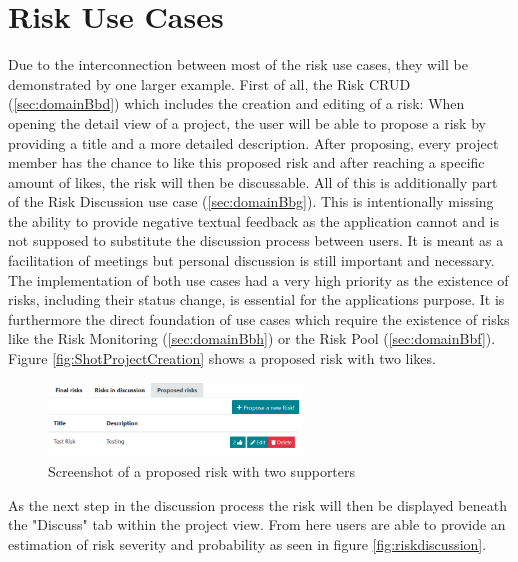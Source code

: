 
\section{Risk Use Cases}
\label{sec:implementationRisks}

Due to the interconnection between most of the risk use cases, they will be demonstrated by one larger example. First of all, the Risk CRUD (\ref{sec:domainBbd}) which includes the creation and editing of a risk: When opening the detail view of a project, the user will be able to propose a risk by providing a title and a more detailed description. After proposing, every project member has the chance to like this proposed risk and after reaching a specific amount of likes, the risk will then be discussable. All of this is additionally part of the Risk Discussion use case (\ref{sec:domainBbg}). This is intentionally missing the ability to provide negative textual feedback as the application cannot and is not supposed to substitute the discussion process between users. It is meant as a facilitation of meetings but personal discussion is still important and necessary. The implementation of both use cases had a very high priority as the existence of risks, including their status change, is essential for the applications purpose. It is furthermore the direct foundation of use cases which require the existence of risks like the Risk Monitoring (\ref{sec:domainBbh}) or the Risk Pool (\ref{sec:domainBbf}). Figure \ref{fig:ShotProjectCreation} shows a proposed risk with two likes.

\begin{figure}[H]
	\centering
	\includegraphics[width=0.6\textwidth]{Assets/implementation_shots/proposed_risk.png}
	\caption{Screenshot of a proposed risk with two supporters}
	\label{fig:proposedrisk}
\end{figure}

As the next step in the discussion process the risk will then be displayed beneath the "Discuss" tab within the project view. From here users are able to provide an estimation of risk severity and probability as seen in figure \ref{fig:riskdiscussion}.

